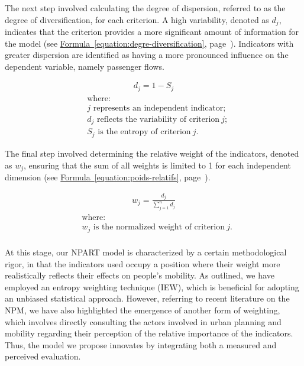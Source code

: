 \begin{refsegment}
The next step involved calculating the degree of dispersion, referred to as the degree of diversification, for each criterion. A high variability, denoted as \(d_j\), indicates that the criterion provides a more significant amount of information for the model (see \hyperref[equation:degre-diversification]{Formula~\ref{equation:degre-diversification}}, page~\pageref{equation:degre-diversification}). Indicators with greater dispersion are identified as having a more pronounced influence on the dependent variable, namely passenger flows.%

\begin{equation}
\label{equation:degre-diversification}
\begin{aligned}
d_j = 1 - S_j
\end{aligned}
\end{equation}
\begin{align*}
    &\text{where:} \\
    &j \text{ represents an independent indicator;}\\
    &d_j \text{ reflects the variability of criterion}~j\text{;}\\
    &S_j \text{ is the entropy of criterion}~j\text{.}
\end{align*}%

The final step involved determining the relative weight of the indicators, denoted as \(w_j\), ensuring that the sum of all weights is limited to 1 for each independent dimension (see \hyperref[equation:poids-relatifs]{Formula~\ref{equation:poids-relatifs}}, page~\pageref{equation:poids-relatifs}).%

\begin{equation}
\label{equation:poids-relatifs}
\begin{aligned}
w_j = \frac{d_j}{\sum\limits_{j=1}^{n} d_j}
\end{aligned}
\end{equation}
\begin{align*}
    &\text{where:} \\
    &w_j \text{ is the normalized weight of criterion}~j\text{.}\\
\end{align*}%

At this stage, our \acrshort{NPART} model is characterized by a certain methodological rigor, in that the indicators used occupy a position where their weight more realistically reflects their effects on people's mobility. As outlined, we have employed an entropy weighting technique (\acrshort{IEW}), which is beneficial for adopting an unbiased statistical approach. However, referring to recent literature on the \acrshort{NPM}, we have also highlighted the emergence of another form of weighting, which involves directly consulting the actors involved in urban planning and mobility regarding their \gls{perception} of the relative importance of the indicators. Thus, the model we propose innovates by integrating both a measured and perceived evaluation.%


\end{refsegment}
